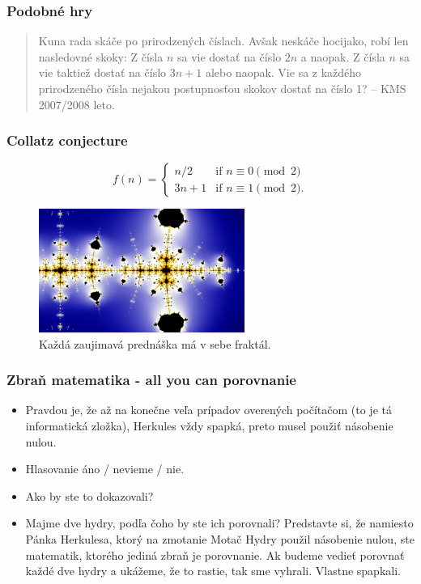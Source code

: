 \documentclass[12pt,a4paper]{article}
\begin{document}
\subsubsection*{Podobné hry}
\begin{quote}
Kuna rada skáče po prirodzených číslach. Avšak neskáče hocijako, robí len nasledovné skoky: Z čísla $n$ sa vie dostať na číslo $2n$ a naopak. Z čísla $n$ sa vie taktiež dostať na číslo $3n + 1$ alebo naopak. Vie sa z každého prirodzeného čísla nejakou postupnosťou skokov dostať na číslo 1? --  KMS 2007/2008 leto. 
\end{quote} 

\subsubsection*{Collatz conjecture}
\begin{equation}
f(n) = \begin{cases} n/2 &\text{if } n \equiv 0 \pmod{2}\\ 3n+1 & \text{if } n\equiv 1 \pmod{2} .\end{cases}
\end{equation} 
\begin{figure}[H]
\centering
\caption{Každá zaujimavá prednáška má v sebe fraktál.} 
\includegraphics[width=0.6\textwidth]{collatz.png}
\end{figure} 

\subsubsection*{Zbraň matematika - all you can porovnanie} 
\begin{itemize}
\item Pravdou je, že až na konečne veľa prípadov overených počítačom (to je tá informatická zložka), Herkules vždy spapká, preto musel použiť násobenie nulou. 
\item Hlasovanie áno / nevieme / nie. 
\item Ako by ste to dokazovali? 
\item Majme dve hydry, podľa čoho by ste ich porovnali? Predstavte si, že namiesto Pánka Herkulesa, ktorý na zmotanie Motač Hydry použil násobenie nulou, ste matematik, ktorého jediná zbraň je porovnanie. Ak budeme vedieť porovnať každé dve hydry a ukážeme, že to rastie, tak sme vyhrali. Vlastne spapkali.  
\end{itemize} 
\end{document}
